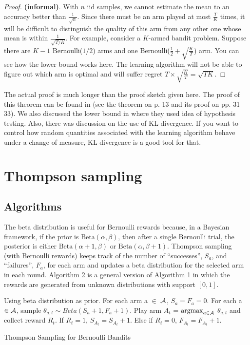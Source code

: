 \documentclass[11pt]{article}
\begin{document}
\begin{proof}
\textbf{(informal)}. With $n$ iid samples, we cannot estimate the mean
to an accuracy better than $\frac{1}{\sqrt{n}}$. Since there must be
an arm played at most $\frac{T}{K}$ times, it will be difficult to
distinguish the quality of this arm from any other one whose mean is
within $\frac{1}{\sqrt{T/K}}$. For example, consider a $K$-armed
bandit problem. Suppose there are $K-1$ Bernoulli($1/2$) arms and one
Bernoulli($\frac{1}{2}+\sqrt{\frac{K}{T}}$) arm. You can see how the lower
bound works here. The learning 
algorithm will not be able to figure out which arm is optimal and will suffer regret $T \times \sqrt{\frac{K}{T}} = \sqrt{TK}$.
\end{proof}
 The actual proof is much longer than the proof sketch given
here. The proof of this theorem can be found in
\cite{auer2002nonstochastic} (see the theorem on p. 13 and its proof
on pp. 31-33). We also discussed the lower bound in \cite{lai1985asymptotically} where they used idea of hypothesis testing. Also, there was discussion on the use of KL divergence. If you want to control how random quantities associated with the learning algorithm behave under a change of measure, KL divergence is  a good tool for that.

\section{Thompson sampling}
\subsection{Algorithms}
The beta distribution is useful for Bernoulli rewards because, in a
Bayesian framework, if the prior is $\text{Beta}(\alpha,\beta)$, then
after a single Bernoulli trial, the posterior is either
$\text{Beta}(\alpha+1,\beta)$ or $\text{Beta}(\alpha, \beta+1)$.
Thompson sampling (with Bernoulli rewards) keeps track of the number of
``successes'', $S_a$, and ``failures'', $F_a$, for each arm and
updates a beta distribution for the selected arm in each round. Algorithm 2 is
a general version of Algorithm 1 in which the rewards are generated
from unknown distributions with support $[0,1]$.
\begin{algorithm}
	\begin{algorithmic}[1]
		\STATE Using beta distribution as prior.
		\STATE For each arm a $\in$ $\mathcal{A}$, $S_{a}=F_{a}=0$.
		\STATE For each a$\in\mathcal{A}$, sample $\theta_{a,t} \sim Beta(S_{a}+1,F_{a}+1)$.
		\STATE Play arm $A_t$ = $\operatorname*{argmax}_{a\in \mathcal{A}}$ $\theta_{a,t}$ and collect reward $R_t$.
		\STATE If $R_t=1$, $S_{A_t}=S_{A_t}+1$. Else if $R_t=0$, $F_{A_t}=F_{A_t}+1$.
		\ENDFOR 
		\end{algorithmic}
		\caption{Thompson Sampling for Bernoulli Bandits}
\end{algorithm}
\end{document}
